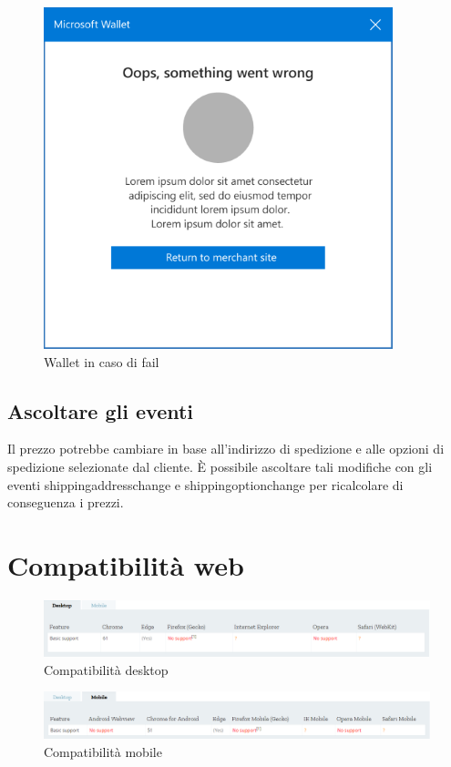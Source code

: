\documentclass[11pt ,a4paper , twoside , openright ]{article}
\begin{document}
	\begin{figure}[h]
		\centering
		\includegraphics[width=0.5\linewidth]{wallet3}
		\caption{Wallet in caso di fail}
		\label{fig: Wallet in caso di fail}
	\end{figure}
	\pagebreak
	\subsection{Ascoltare gli eventi}
	Il prezzo potrebbe cambiare in base all'indirizzo di spedizione e alle opzioni di spedizione selezionate dal cliente. È possibile ascoltare tali modifiche con gli eventi shippingaddresschange e shippingoptionchange per ricalcolare di conseguenza i prezzi.
	
	\newpage
	\section{Compatibilità web}
	\begin{figure}[h]
		\centering
		\includegraphics[width=1\linewidth]{Compatibilita1}
		\caption{Compatibilità desktop}
		\label{fig: Compatibilità desktop}
	\end{figure}
	\begin{figure}[h]
		\centering
		\includegraphics[width=1\linewidth]{Compatibilita2}
		\caption{Compatibilità mobile}
		\label{fig: Compatibilità mobile}
	\end{figure}
	\newpage
\end{document}
